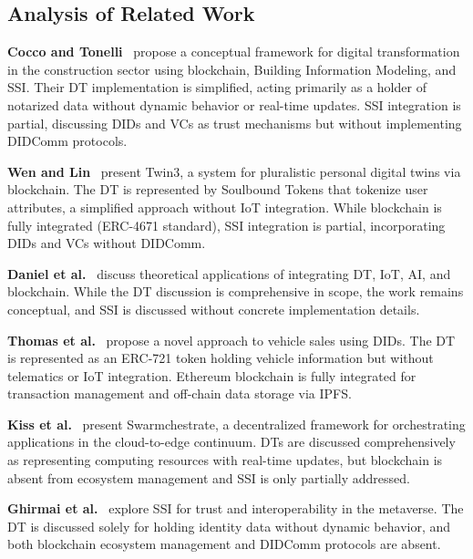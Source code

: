 \subsection{Analysis of Related Work}
\label{subsec:analysis-related}

\textbf{Cocco and Tonelli}~\cite{cocco:tonelli:2024} propose a conceptual framework for digital transformation in the construction sector using blockchain, Building Information Modeling, and \ac{SSI}.
Their \ac{DT} implementation is simplified, acting primarily as a holder of notarized data without dynamic behavior or real-time updates.
\ac{SSI} integration is partial, discussing \acp{DID} and \acp{VC} as trust mechanisms but without implementing \ac{DIDComm} protocols.

\textbf{Wen and Lin}~\cite{wen:lin:2024} present Twin3, a system for pluralistic personal digital twins via blockchain.
The \ac{DT} is represented by Soulbound Tokens that tokenize user attributes, a simplified approach without \ac{IoT} integration.
While blockchain is fully integrated (ERC-4671 standard), \ac{SSI} integration is partial, incorporating \acp{DID} and \acp{VC} without \ac{DIDComm}.

\textbf{Daniel et al.}~\cite{daniel:sriramulu:partheeban:etal:2024} discuss theoretical applications of integrating \ac{DT}, \ac{IoT}, \ac{AI}, and blockchain.
While the \ac{DT} discussion is comprehensive in scope, the work remains conceptual, and \ac{SSI} is discussed without concrete implementation details.

\textbf{Thomas et al.}~\cite{thomas:lakshmy:ramaguru:etal:2023} propose a novel approach to vehicle sales using \acp{DID}.
The \ac{DT} is represented as an ERC-721 token holding vehicle information but without telematics or \ac{IoT} integration.
Ethereum blockchain is fully integrated for transaction management and off-chain data storage via \ac{IPFS}.

\textbf{Kiss et al.}~\cite{kiss:ullah:terstyanszky:etal:2024} present Swarmchestrate, a decentralized framework for orchestrating applications in the cloud-to-edge continuum.
\acp{DT} are discussed comprehensively as representing computing resources with real-time updates, but blockchain is absent from ecosystem management and \ac{SSI} is only partially addressed.

\textbf{Ghirmai et al.}~\cite{ghirmai:mebrahtom:aloqaily:etal:2022} explore \ac{SSI} for trust and interoperability in the metaverse.
The \ac{DT} is discussed solely for holding identity data without dynamic behavior, and both blockchain ecosystem management and \ac{DIDComm} protocols are absent.

